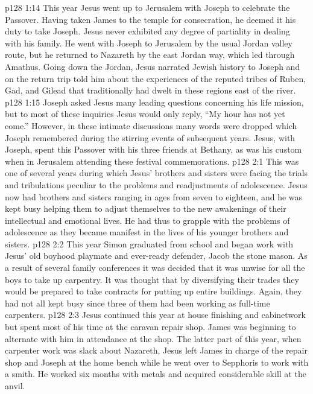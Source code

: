 \pc \vs p128 1:14 This year Jesus went up to Jerusalem with Joseph to celebrate the Passover. Having taken James to the temple for consecration, he deemed it his duty to take Joseph. Jesus never exhibited any degree of partiality in dealing with his family. He went with Joseph to Jerusalem by the usual Jordan valley route, but he returned to Nazareth by the east Jordan way, which led through Amathus. Going down the Jordan, Jesus narrated Jewish history to Joseph and on the return trip told him about the experiences of the reputed tribes of Ruben, Gad, and Gilead that traditionally had dwelt in these regions east of the river.
\vs p128 1:15 Joseph asked Jesus many leading questions concerning his life mission, but to most of these inquiries Jesus would only reply, \textcolor{ubdarkred}{“My hour has not yet come.”} However, in these intimate discussions many words were dropped which Joseph remembered during the stirring events of subsequent years. Jesus, with Joseph, spent this Passover with his three friends at Bethany, as was his custom when in Jerusalem attending these festival commemorations.
\vs p128 2:1 This was one of several years during which Jesus’ brothers and sisters were facing the trials and tribulations peculiar to the problems and readjustments of adolescence. Jesus now had brothers and sisters ranging in ages from seven to eighteen, and he was kept busy helping them to adjust themselves to the new awakenings of their intellectual and emotional lives. He had thus to grapple with the problems of adolescence as they became manifest in the lives of his younger brothers and sisters.
\vs p128 2:2 This year Simon graduated from school and began work with Jesus’ old boyhood playmate and ever\hyp{}ready defender, Jacob the stone mason. As a result of several family conferences it was decided that it was unwise for all the boys to take up carpentry. It was thought that by diversifying their trades they would be prepared to take contracts for putting up entire buildings. Again, they had not all kept busy since three of them had been working as full\hyp{}time carpenters.
\vs p128 2:3 Jesus continued this year at house finishing and cabinetwork but spent most of his time at the caravan repair shop. James was beginning to alternate with him in attendance at the shop. The latter part of this year, when carpenter work was slack about Nazareth, Jesus left James in charge of the repair shop and Joseph at the home bench while he went over to Sepphoris to work with a smith. He worked six months with metals and acquired considerable skill at the anvil.
